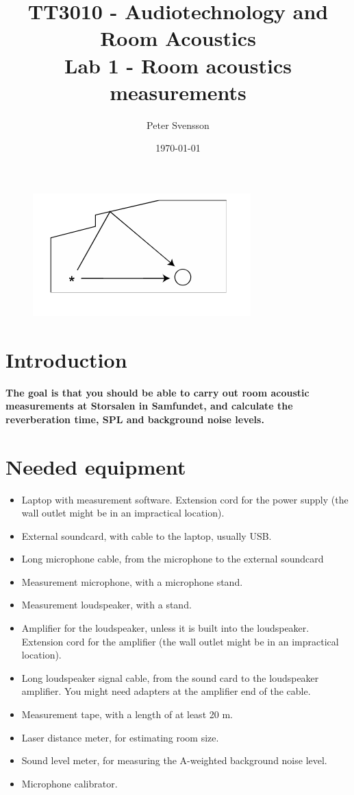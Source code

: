 \documentclass{article}
\title{TT3010 - Audiotechnology and Room Acoustics \\ Lab 1 - Room acoustics measurements}
\author{Peter Svensson}
\date{\today}
\begin{document}
\maketitle

\begin{figure}[H]
\centering
\includegraphics[scale=2.5]{figs/lab1.png}
\end{figure}

\section{Introduction}
\textbf{The goal is that you should be able to carry
out room acoustic measurements at Storsalen in Samfundet, and calculate the reverberation
time, SPL and background noise levels.}

\section{Needed equipment}

\begin{itemize}
    \item Laptop with measurement software. Extension cord for the power supply (the wall outlet might be in an impractical location).
     \item External soundcard, with cable to the laptop, usually USB.
     \item Long microphone cable, from the microphone to the external soundcard
     \item Measurement microphone, with a microphone stand.
     \item Measurement loudspeaker, with a stand.
     \item Amplifier for the loudspeaker, unless it is built into the loudspeaker. Extension cord for the amplifier (the wall outlet might be in an impractical location).
     \item Long loudspeaker signal cable, from the sound card to the loudspeaker amplifier. You might need adapters at the amplifier end of the cable.
     \item Measurement tape, with a length of at least 20 m.
     \item Laser distance meter, for estimating room size.
     \item Sound level meter, for measuring the A-weighted background noise level.
     \item Microphone calibrator.
\end{itemize}
\end{document}
